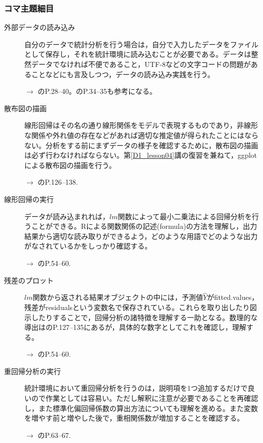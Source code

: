 \subsubsection{コマ主題細目}
\begin{description}
\item[外部データの読み込み]自分のデータで統計分析を行う場合は，自分で入力したデータをファイルとして保存し，それを統計環境に読み込むことが必要である。データは整然データでなければ不便であること，UTF-8などの文字コードの問題があることなどにも言及しつつ，データの読み込み実践を行う。
\begin{flushright}
    $\to$ \citet{紀ノ定201806}のP.28--40。\citet{kosugi2019}のP.34--35も参考になる。
\end{flushright}

\item[散布図の描画]線形回帰はその名の通り線形関係をモデルで表現するものであり，非線形な関係や外れ値の存在などがあれば適切な推定値が得られたことにはならない。分析をする前にまずデータの様子を確認するために，散布図の描画は必ず行わなければならない。第\ref{D1_lesson04}講の復習を兼ねて，ggplotによる散布図の描画を行う。
\begin{flushright}
    $\to$ \citet{紀ノ定201806}のP.126--138.
\end{flushright}

\item[線形回帰の実行]データが読み込まれれば，$lm$関数によって最小二乗法による回帰分析を行うことができる。Rによる関数関係の記述(formula)の方法を理解し，出力結果から適切な読み取りができるよう，どのような用語でどのような出力がなされているかをしっかり確認する。
\begin{flushright}
    $\to$ \citet{kosugi2018}のP.54--60.
\end{flushright}

\item[残差のプロット]$lm$関数から返される結果オブジェクトの中には，予測値$\hat{Y}$がfitted.values，残差がresidualsという変数名で保存されている。これらを取り出したり図示したりすることで，回帰分析の諸特徴を理解する一助となる。数理的な導出は\citet{kosugi2018}のP.127--135にあるが，具体的な数字としてこれを確認し，理解する。
\begin{flushright}
    $\to$ \citet{kosugi2018}のP.54--60.
\end{flushright}

\item[重回帰分析の実行]統計環境において重回帰分析を行うのは，説明項を1つ追加するだけで良いので作業としては容易い。ただし解釈に注意が必要であることを再確認し，また標準化偏回帰係数の算出方法についても理解を進める。また変数を増やす前と増やした後で，重相関係数が増加することを確認する。
\begin{flushright}
    $\to$ \citet{kosugi2018}のP.63--67.
\end{flushright}

\end{description}
